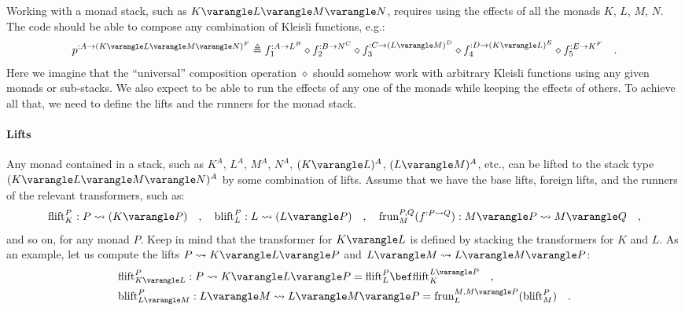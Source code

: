 Working with a monad stack, such as $K\varangle L\varangle M\varangle N$,
requires using the effects of all the monads $K$, $L$, $M$, $N$.
The code should be able to compose any combination of Kleisli functions,
e.g.:
\[
p^{:A\rightarrow(K\varangle L\varangle M\varangle N)^{F}}\triangleq f_{1}^{:A\rightarrow L^{B}}\diamond f_{2}^{:B\rightarrow N^{C}}\diamond f_{3}^{:C\rightarrow(L\varangle M)^{D}}\diamond f_{4}^{:D\rightarrow(K\varangle L)^{E}}\diamond f_{5}^{:E\rightarrow K^{F}}\quad.
\]
Here we imagine that the \textsf{``}universal\textsf{''} composition operation $\diamond$
should somehow work with arbitrary Kleisli functions using any given
monads or sub-stacks. We also expect to be able to run the effects
of any one of the monads while keeping the effects of others. To achieve
all that, we need to define the lifts and the runners for the monad
stack.

\paragraph{Lifts}

Any monad contained in a stack, such as $K^{A}$, $L^{A}$, $M^{A}$,
$N^{A}$, $(K\varangle L)^{A}$, $(L\varangle M)^{A}$, etc., can
be lifted to the stack type $(K\varangle L\varangle M\varangle N)^{A}$
by some combination of lifts. Assume that we have the base lifts,
foreign lifts, and the runners of the relevant transformers, such
as:
\[
\text{flift}_{K}^{P}:P\leadsto(K\varangle P)\quad,\quad\text{blift}_{L}^{P}:L\leadsto(L\varangle P)\quad,\quad\text{frun}_{M}^{P,Q}(f^{:P\leadsto Q}):M\varangle P\leadsto M\varangle Q\quad,
\]
and so on, for any monad $P$. Keep in mind that the transformer for
$K\varangle L$ is defined by stacking the transformers for $K$ and
$L$. As an example, let us compute the lifts $P\leadsto K\varangle L\varangle P$
and $L\varangle M\leadsto L\varangle M\varangle P$: 
\begin{align*}
 & \text{flift}_{K\varangle L}^{P}:P\leadsto K\varangle L\varangle P=\text{flift}_{L}^{P}\bef\text{flift}_{K}^{L\varangle P}\quad,\\
 & \text{blift}_{L\varangle M}^{P}:L\varangle M\leadsto L\varangle M\varangle P=\text{frun}_{L}^{M,M\varangle P}(\text{blift}_{M}^{P})\quad.
\end{align*}

